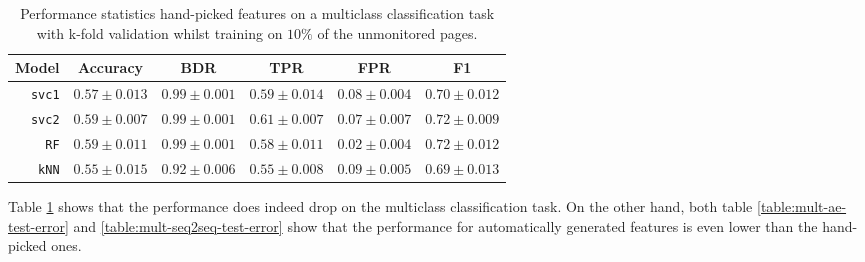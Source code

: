 \begin{table}[ht]
  \centering
  \begin{tabular}{ r  r  r  r  r  r } \hline
    \multicolumn{1}{c}{\textbf{Model}} & \multicolumn{1}{c}{\textbf{Accuracy}} & \multicolumn{1}{c}{\textbf{BDR}} & \multicolumn{1}{c}{\textbf{TPR}} &
      \multicolumn{1}{c}{\textbf{FPR}} & \multicolumn{1}{c}{\textbf{F1}} \\ \hline

    \texttt{svc1} & $0.57 \pm 0.013$ & $0.99 \pm 0.001$ & $0.59 \pm 0.014$ & $0.08 \pm 0.004$ & $0.70 \pm 0.012$ \\

    \texttt{svc2} & $0.59 \pm 0.007$ & $0.99 \pm 0.001$ & $0.61 \pm 0.007$ & $0.07 \pm 0.007$ & $0.72 \pm 0.009$ \\

    \texttt{RF} & $0.59 \pm 0.011$ & $0.99 \pm 0.001$ & $0.58 \pm 0.011$ & $0.02 \pm 0.004$ & $0.72 \pm 0.012$\\

    \texttt{kNN} & $0.55 \pm 0.015$ & $0.92 \pm 0.006$ & $0.55 \pm 0.008$ & $0.09 \pm 0.005$ & $0.69 \pm 0.013$ \\

    \hline
  \end{tabular}
  \caption{Performance statistics hand-picked features on a multiclass classification task with k-fold validation whilst training on $10\%$ of the unmonitored pages.}
  \label{table:mult-handpicked-test-error}
\end{table}

Table \ref{table:mult-handpicked-test-error} shows that the performance does indeed drop on the multiclass classification task.
On the other hand, both table \ref{table:mult-ae-test-error} and \ref{table:mult-seq2seq-test-error} show that the performance for automatically generated features is even lower than the hand-picked ones.

